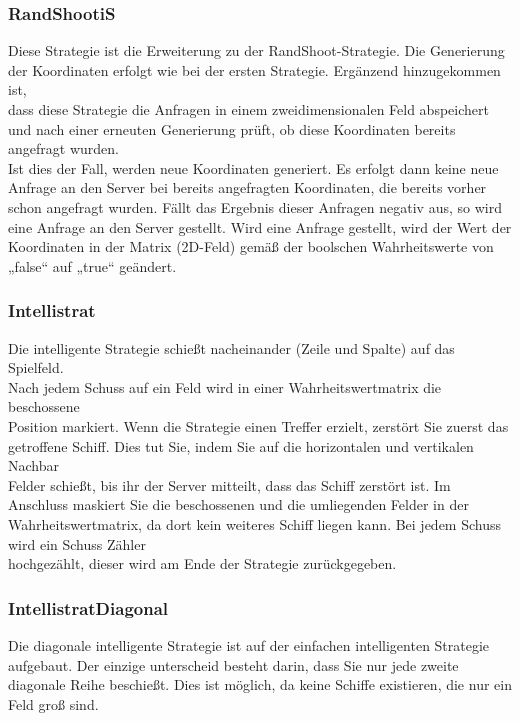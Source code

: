 \subsubsection{RandShootiS}

Diese Strategie ist die Erweiterung zu der RandShoot-Strategie. Die Generierung der
Koordinaten erfolgt wie bei der ersten Strategie. Ergänzend hinzugekommen ist, \\dass
diese Strategie die Anfragen in einem zweidimensionalen Feld abspeichert und nach
einer erneuten Generierung prüft, ob diese Koordinaten bereits angefragt wurden. \\Ist
dies der Fall, werden neue Koordinaten generiert. Es erfolgt dann keine neue Anfrage an
den Server bei bereits angefragten Koordinaten, die bereits vorher schon angefragt
wurden. Fällt das Ergebnis dieser Anfragen negativ aus, so wird eine Anfrage an den
Server gestellt. Wird eine Anfrage gestellt, wird der Wert der Koordinaten in der Matrix
(2D-Feld) gemäß der boolschen Wahrheitswerte von „false“ auf „true“ geändert.

\subsubsection{Intellistrat}

Die intelligente Strategie schießt nacheinander (Zeile und Spalte) auf das Spielfeld. \\Nach jedem Schuss auf ein Feld wird in einer Wahrheitswertmatrix die 
beschossene \\Position markiert. Wenn die Strategie einen Treffer erzielt, zerstört Sie zuerst das \\getroffene Schiff. Dies tut Sie, indem Sie auf die horizontalen 
und vertikalen Nachbar \\Felder schießt, bis ihr der Server mitteilt, dass das Schiff zerstört ist. Im Anschluss maskiert Sie die beschossenen und die umliegenden 
Felder in der Wahrheitswertmatrix, da dort kein weiteres Schiff liegen kann. Bei jedem Schuss wird ein Schuss Zähler \\hochgezählt, dieser wird am Ende der 
Strategie zurückgegeben.

\subsubsection{IntellistratDiagonal}

Die diagonale intelligente Strategie ist auf der einfachen intelligenten Strategie aufgebaut. Der einzige unterscheid besteht darin, dass Sie nur jede zweite 
diagonale Reihe beschießt. Dies ist möglich, da keine Schiffe existieren, die nur ein Feld groß sind.


